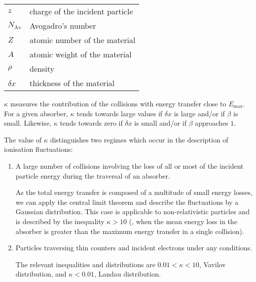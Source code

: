 \begin{tabular}{ll}
$z$ & charge of the incident particle \\
$N_{\mathrm{Av}}$ & Avogadro's number \\
$Z$ & atomic number of the material \\
$A$ & atomic weight of the material \\
$\rho$ & density \\
$ \delta x$ & thickness of the material \\
\end{tabular}

$\kappa$ measures the contribution of the collisions with energy transfer close to $E_{\mathrm{max}}$.  For a given absorber, $\kappa$ tends towards large values if $\delta x$ is large and/or if $\beta$ is small.  Likewise, $\kappa$ tends towards zero if $\delta x $ is small and/or if $\beta$ approaches $1$.

The value of $\kappa$ distinguishes two regimes which occur in the description of ionisation fluctuations:

\begin{enumerate}
\item A large number of collisions involving the loss of all or most of the incident particle energy during the traversal of an absorber.

As the total energy transfer is composed of a multitude of small energy losses, we can apply the central limit theorem and describe the fluctuations by a Gaussian distribution. This case is applicable to non-relativistic particles and is described by the inequality $\kappa > 10 $ (\ie, when the mean energy loss in the absorber is greater than the maximum energy transfer in a single collision).

\item Particles traversing thin counters and incident electrons under any conditions.

The relevant inequalities and distributions are $ 0.01 < \kappa < 10 $, Vavilov distribution, and $\kappa < 0.01 $, Landau distribution.
\end{enumerate}

